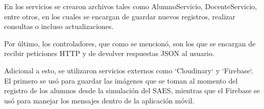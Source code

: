 En los servicios se crearon archivos tales como AlumnoServicio, DocenteServicio, entre otros, en los cuales se encargan de guardar nuevos registros, realizar consultas o incluso actualizaciones.

Por último, los controladores, que como se mencionó, son los que se encargan de recibir peticiones HTTP y de devolver respuestas JSON al usuario.

Adicional a esto, se utilizaron servicios externos como `Cloudinary` y `Firebase`. El primero se usó para guardar las imágenes que se toman al momento del registro de los alumnos desde la simulación del SAES, mientras que el Firebase se usó para manejar los mensajes dentro de la aplicación móvil.

%
%
%
%
%
